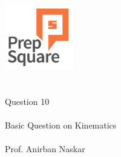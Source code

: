 \documentclass{beamer}
\begin{document}
\begin{center}
\ \\ \ \\
\includegraphics[width=30mm]{Logo-final.png} \\
\ \\ \ \\ 
{\huge Question 10 \\ \ \\ }
{\Large
Basic Question on Kinematics
}
{\large \ \\ \ \\ Prof. Anirban Naskar }
\end{center}
\end{document}
